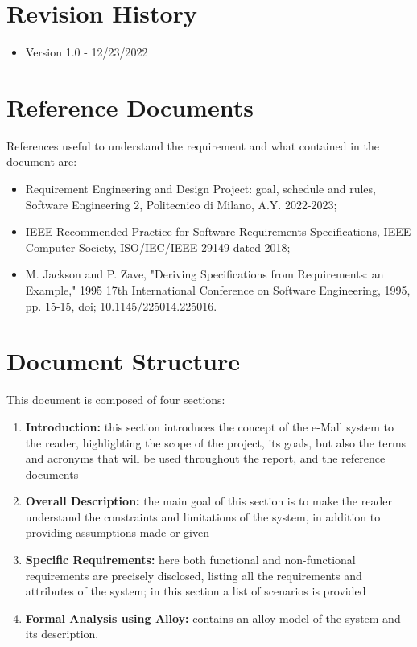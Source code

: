 \documentclass[12pt]{report}
\begin{document}
\bigskip

\section{Revision History}
\begin{itemize}
    \item Version 1.0 - 12/23/2022
\end{itemize}

\bigskip

\section{Reference Documents}
References useful to understand the requirement and what contained in the document are:
\begin{itemize}
    \item Requirement Engineering and Design Project: goal, schedule and rules, Software Engineering 2, Politecnico di Milano, A.Y. 2022-2023;\\
    \item IEEE Recommended Practice for Software Requirements Specifications, IEEE Computer Society, ISO/IEC/IEEE 29149 dated 2018;\\
    \item M. Jackson and P. Zave, "Deriving Specifications from Requirements: an Example," 1995 17th International Conference on Software Engineering, 1995, pp. 15-15, doi; 10.1145/225014.225016. 
 \end{itemize}

 \bigskip

\section{Document Structure}
This document is composed of four sections:

\begin{enumerate}
\item \textbf{Introduction:} this section introduces the concept of the e-Mall system to the reader, highlighting the scope of the project, its goals, but also the terms and acronyms that will be used throughout the report, and the reference documents
\item\textbf{Overall Description:} the main goal of this section is to make the reader understand the constraints and limitations of the system, in addition to providing assumptions made or given
\item\textbf{Specific Requirements:} here both functional and non-functional requirements are precisely disclosed, listing all the requirements and attributes of the system; in this section a list of scenarios is provided
\item \textbf{Formal Analysis using Alloy:}  contains an alloy model of the system and its description.
\end{enumerate}
\end{document}
